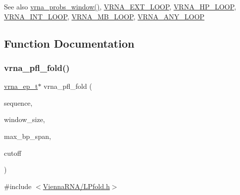 \begin{DoxySeeAlso}{See also}
\mbox{\hyperlink{group__local__pf__fold_ga70ec33810fa17a9f67a7c59f156d0137}{vrna\+\_\+probs\+\_\+window()}}, \mbox{\hyperlink{_l_pfold_8h_af0bb577130090f6c856d1358804250bf}{V\+R\+N\+A\+\_\+\+E\+X\+T\+\_\+\+L\+O\+OP}}, \mbox{\hyperlink{_l_pfold_8h_a30170811c320f3a7b23ffff3b3343b91}{V\+R\+N\+A\+\_\+\+H\+P\+\_\+\+L\+O\+OP}}, \mbox{\hyperlink{_l_pfold_8h_a956a237e7d956b684b7d593cb3eca665}{V\+R\+N\+A\+\_\+\+I\+N\+T\+\_\+\+L\+O\+OP}}, \mbox{\hyperlink{_l_pfold_8h_ad905b71f02b3799eb84b490435aec837}{V\+R\+N\+A\+\_\+\+M\+B\+\_\+\+L\+O\+OP}}, \mbox{\hyperlink{_l_pfold_8h_a1fef1ad234755db78ab6b695edce5080}{V\+R\+N\+A\+\_\+\+A\+N\+Y\+\_\+\+L\+O\+OP}} 
\end{DoxySeeAlso}


\subsection{Function Documentation}
\mbox{\label{group__local__pf__fold_ga6267230f20cab0e2315375310b4dad85}} 
\subsubsection{\texorpdfstring{vrna\+\_\+pfl\+\_\+fold()}{vrna\_pfl\_fold()}}
{\footnotesize\ttfamily \mbox{\hyperlink{group__struct__utils_gab9ac98ab55ded9fb90043b024b915aca}{vrna\+\_\+ep\+\_\+t}}$\ast$ vrna\+\_\+pfl\+\_\+fold (\begin{DoxyParamCaption}\item[{const char $\ast$}]{sequence,  }\item[{int}]{window\+\_\+size,  }\item[{int}]{max\+\_\+bp\+\_\+span,  }\item[{float}]{cutoff }\end{DoxyParamCaption})}



{\ttfamily \#include $<$\mbox{\hyperlink{_l_pfold_8h}{Vienna\+R\+N\+A/\+L\+Pfold.\+h}}$>$}



